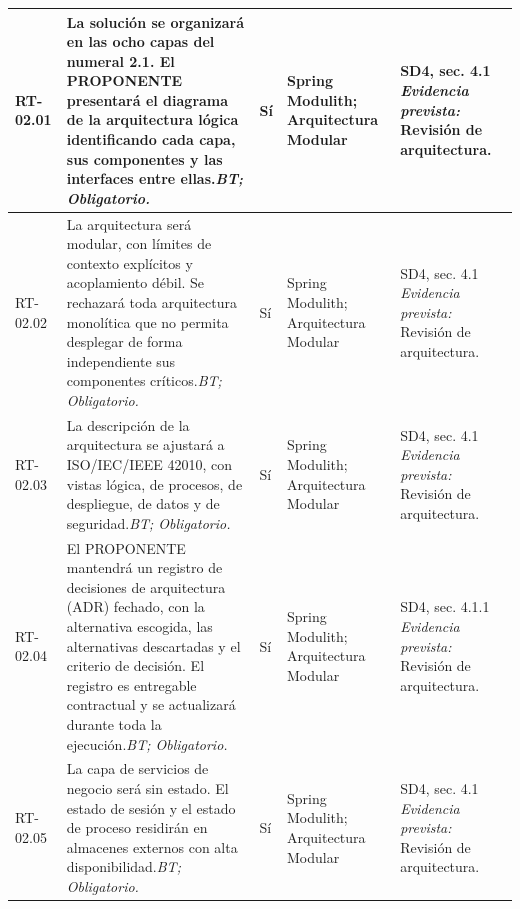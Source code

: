 \begin{paginaHorizontalSynaptix}
\begin{longtable}{|L{0.09\AnchoMatrizTDoce}|L{0.385\AnchoMatrizTDoce}|L{0.065\AnchoMatrizTDoce}|L{0.18\AnchoMatrizTDoce}|L{0.28\AnchoMatrizTDoce}|}
\hline

\endlastfoot


RT-\allowbreak{}02.\allowbreak{}01 &
La solución se organizará en las ocho capas del numeral 2.1. El PROPONENTE presentará el diagrama de la arquitectura lógica identificando cada capa, sus componentes y las interfaces entre ellas.\newline\textit{BT; Obligatorio.} &
Sí &
Spring Modulith; Arquitectura Modular &
SD4, sec. 4.1 \newline\textit{Evidencia prevista:} Revisión de arquitectura. \\ \hline

RT-\allowbreak{}02.\allowbreak{}02 &
La arquitectura será modular, con límites de contexto explícitos y acoplamiento débil. Se rechazará toda arquitectura monolítica que no permita desplegar de forma independiente sus componentes críticos.\newline\textit{BT; Obligatorio.} &
Sí &
Spring Modulith; Arquitectura Modular &
SD4, sec. 4.1 \newline\textit{Evidencia prevista:} Revisión de arquitectura. \\ \hline

RT-\allowbreak{}02.\allowbreak{}03 &
La descripción de la arquitectura se ajustará a ISO/IEC/IEEE 42010, con vistas lógica, de procesos, de despliegue, de datos y de seguridad.\newline\textit{BT; Obligatorio.} &
Sí &
Spring Modulith; Arquitectura Modular &
SD4, sec. 4.1 \newline\textit{Evidencia prevista:} Revisión de arquitectura. \\ \hline

RT-\allowbreak{}02.\allowbreak{}04 &
El PROPONENTE mantendrá un registro de decisiones de arquitectura (ADR) fechado, con la alternativa escogida, las alternativas descartadas y el criterio de decisión. El registro es entregable contractual y se actualizará durante toda la ejecución.\newline\textit{BT; Obligatorio.} &
Sí &
Spring Modulith; Arquitectura Modular &
SD4, sec. 4.1.1 \newline\textit{Evidencia prevista:} Revisión de arquitectura. \\ \hline

RT-\allowbreak{}02.\allowbreak{}05 &
La capa de servicios de negocio será sin estado. El estado de sesión y el estado de proceso residirán en almacenes externos con alta disponibilidad.\newline\textit{BT; Obligatorio.} &
Sí &
Spring Modulith; Arquitectura Modular &
SD4, sec. 4.1 \newline\textit{Evidencia prevista:} Revisión de arquitectura. \\ \hline


\end{longtable}
\end{paginaHorizontalSynaptix}
